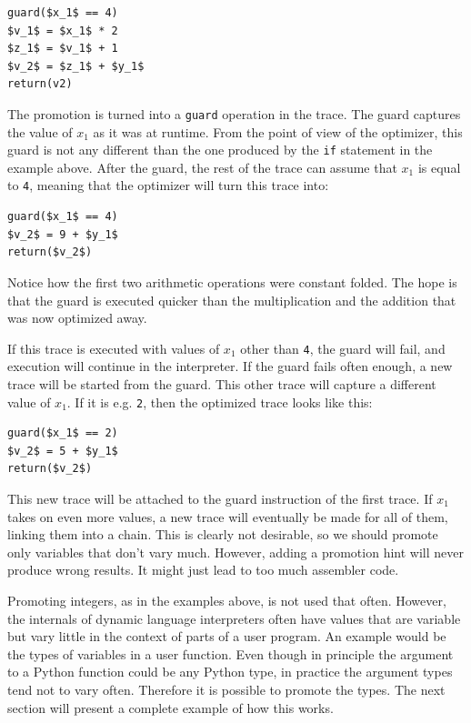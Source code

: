 \documentclass{sigplanconf}
\begin{document}
\begin{lstlisting}[mathescape,basicstyle=\ttfamily]
guard($x_1$ == 4)
$v_1$ = $x_1$ * 2
$z_1$ = $v_1$ + 1
$v_2$ = $z_1$ + $y_1$
return(v2)
\end{lstlisting}

The promotion is turned into a \texttt{guard} operation in the trace. The guard
captures the value of $x_1$ as it was at runtime. From the point of view of the
optimizer, this guard is not any different than the one produced by the \texttt{if}
statement in the example above. After the guard, the rest of the trace can
assume that $x_1$ is equal to \texttt{4}, meaning that the optimizer will turn this
trace into:

\begin{lstlisting}[mathescape,basicstyle=\ttfamily]
guard($x_1$ == 4)
$v_2$ = 9 + $y_1$
return($v_2$)
\end{lstlisting}

Notice how the first two arithmetic operations were constant folded. The hope is
that the guard is executed quicker than the multiplication and the addition that
was now optimized away.

If this trace is executed with values of $x_1$ other than \texttt{4}, the guard will
fail, and execution will continue in the interpreter. If the guard fails often
enough, a new trace will be started from the guard. This other trace will
capture a different value of $x_1$. If it is e.g. \texttt{2}, then the optimized
trace looks like this:

\begin{lstlisting}[mathescape,basicstyle=\ttfamily]
guard($x_1$ == 2)
$v_2$ = 5 + $y_1$
return($v_2$)
\end{lstlisting}

This new trace will be attached to the guard instruction of the first trace. If
$x_1$ takes on even more values, a new trace will eventually be made for all of them,
linking them into a chain. This is clearly not desirable, so we should promote
only variables that don't vary much. However, adding a promotion hint will never produce wrong
results. It might just lead to too much assembler code.

Promoting integers, as in the examples above, is not used that often.
However, the internals of dynamic language interpreters often
have values that are variable but vary little in the context of parts of a user
program. An example would be the types of variables in a user function. Even
though in principle the argument to a Python function could be any Python type,
in practice the argument types tend not to vary often. Therefore it is possible to
promote the types. The next section will present a complete example of how
this works.
\end{document}
